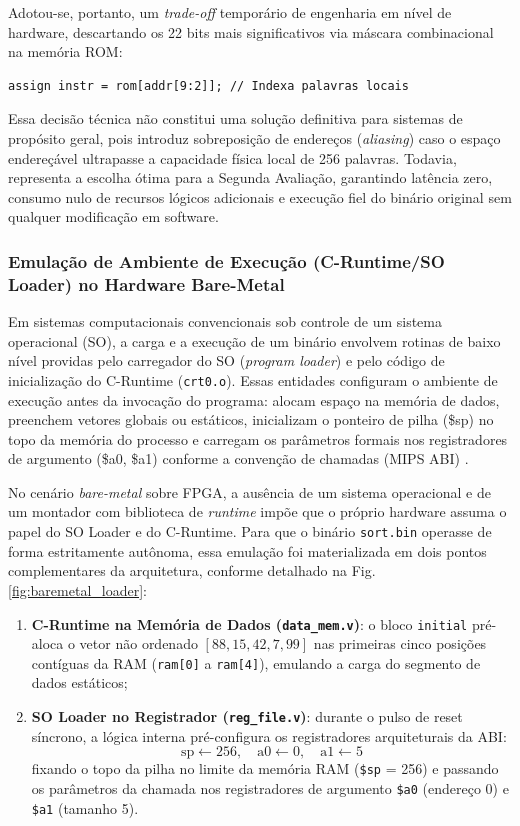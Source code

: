 Adotou-se, portanto, um \textit{trade-off} temporário de engenharia em nível de hardware, descartando os 22 bits mais significativos via máscara combinacional na memória ROM:
\begin{lstlisting}[style=estiloVerilog]
assign instr = rom[addr[9:2]]; // Indexa palavras locais
\end{lstlisting}
Essa decisão técnica não constitui uma solução definitiva para sistemas de propósito geral, pois introduz sobreposição de endereços (\textit{aliasing}) caso o espaço endereçável ultrapasse a capacidade física local de 256 palavras. Todavia, representa a escolha ótima para a Segunda Avaliação, garantindo latência zero, consumo nulo de recursos lógicos adicionais e execução fiel do binário original sem qualquer modificação em software.

\subsubsection{Emulação de Ambiente de Execução (C-Runtime/SO Loader) no Hardware Bare-Metal}
Em sistemas computacionais convencionais sob controle de um sistema operacional (SO), a carga e a execução de um binário envolvem rotinas de baixo nível providas pelo carregador do SO (\textit{program loader}) e pelo código de inicialização do C-Runtime (\texttt{crt0.o}). Essas entidades configuram o ambiente de execução antes da invocação do programa: alocam espaço na memória de dados, preenchem vetores globais ou estáticos, inicializam o ponteiro de pilha (\$sp) no topo da memória do processo e carregam os parâmetros formais nos registradores de argumento (\$a0, \$a1) conforme a convenção de chamadas (MIPS ABI) \cite{patterson_mips}.

No cenário \textit{bare-metal} sobre FPGA, a ausência de um sistema operacional e de um montador com biblioteca de \textit{runtime} impõe que o próprio hardware assuma o papel do SO Loader e do C-Runtime. Para que o binário \texttt{sort.bin} operasse de forma estritamente autônoma, essa emulação foi materializada em dois pontos complementares da arquitetura, conforme detalhado na Fig. \ref{fig:baremetal_loader}:
\begin{enumerate}
    \item \textbf{C-Runtime na Memória de Dados (\texttt{data\_mem.v})}: o bloco \texttt{initial} pré-aloca o vetor não ordenado $[88, 15, 42, 7, 99]$ nas primeiras cinco posições contíguas da RAM (\texttt{ram[0]} a \texttt{ram[4]}), emulando a carga do segmento de dados estáticos;
    \item \textbf{SO Loader no Registrador (\texttt{reg\_file.v})}: durante o pulso de reset síncrono, a lógica interna pré-configura os registradores arquiteturais da ABI:
    \begin{equation}
        \text{sp} \leftarrow 256, \quad \text{a0} \leftarrow 0, \quad \text{a1} \leftarrow 5
    \end{equation}
    fixando o topo da pilha no limite da memória RAM (\texttt{\$sp} = 256) e passando os parâmetros da chamada nos registradores de argumento \texttt{\$a0} (endereço 0) e \texttt{\$a1} (tamanho 5).
\end{enumerate}

